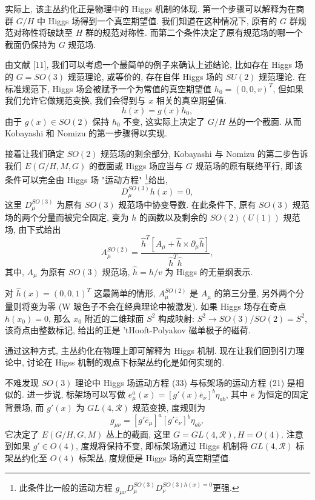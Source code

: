 \documentclass{article}
\begin{document}
实际上, 该主丛约化正是物理中的 Higgs 机制的体现. 第一个步骤可以解释为在商群 $G/H$ 中 Higgs 场得到一个真空期望值. 我们知道在这种情况下, 原有的 $G$ 群规范对称性将破缺至 $H$ 群的规范对称性. 而第二个条件决定了原有规范场的哪一个截面仍保持为 $G$ 规范场.

由文献 [11], 我们可以考虑一个最简单的例子来确认上述结论, 比如存在 Higgs 场的 $G=SO(3)$ 规范理论, 或等价的, 存在自伴 Higgs 场的 $SU(2)$ 规范理论. 在标准规范下, Higgs 场会被赋予一个为常值的真空期望值 $h_{0}=(0,0,v)^{T}$, 但如果我们允许它做规范变换, 我们会得到与 $x$ 相关的真空期望值.
\begin{equation}
h(x)=g(x)h_{0},
\end{equation}
由于 $g(x)\in SO(2)$ 保持 $h_{0}$ 不变, 这实际上决定了 $G/H$ 丛的一个截面. 从而 Kobayashi 和 Nomizu 的第一步骤得以实现.

接着让我们确定 $SO(2)$ 规范场的剩余部分, Kobayashi 与 Nomizu 的第二步告诉我们  $E(G/H,M,G)$ 的截面或 Higgs 场应当与 $G$ 规范场的原有联络平行, 即该条件可以完全由 Higgs 场 "运动方程" \footnote{此条件比一般的运动方程 $g_{\mu\nu}D_{\mu}^{SO(3)}D_{\nu}^{SO(3)h(x)=0}$更强.}给出,
\begin{equation}
D_{\mu}^{SO(3)}h(x)=0,
\end{equation}
这里 $D_{\mu}^{SO(3)}$ 为原有 $SO(3)$ 规范场中协变导数. 在此条件下, 原有 $SO(3)$ 规范场的两个分量而被完全固定, 变为 $h$ 的函数以及剩余的 $SO(2)(U(1))$ 规范场, 由下式给出
\begin{equation}
A_{\mu}^{SO(2)}=\frac{\hat{h}^{T}[A_{\mu}+\hat{h}\times \partial_{\mu}\hat{h}]}{\hat{h}^{T}\hat{h}},
\end{equation}
其中, $A_{\mu}$ 为原有 $SO(3)$ 规范场, $\hat{h}=h/v$ 为 Higgs 的无量纲表示.

对 $\hat{h}(x)=(0,0,1)^{T}$ 这最简单的情形, $A_{\mu}^{SO(2)}$ 是 $A_{\mu}$ 的第三分量, 另外两个分量则将变为零 (W 玻色子不会在经典理论中被激发). 如果 Higgs 场存在奇点 $h(x_{0})=0$, 那么 $x_{0}$ 附近的二维球面 $S^{2}$ 构成映射: $S^{2}\rightarrow SO(3)/SO(2)=S^{2}$, 该奇点由整数标记, 给出的正是 'tHooft-Polyakov 磁单极子的磁荷.

通过这种方式, 主丛约化在物理上即可解释为 Higgs 机制. 现在让我们回到引力理论中, 讨论在 Higss 机制的观点下标架丛约化是如何实现的.

不难发现 $SO(3)$ 理论中 Higgs 场运动方程 (33) 与标架场的运动方程 (21) 是相似的. 进一步说, 标架场可以写做 $e_{\mu}^{a}(x)=[g'(x)\bar{e}_{\nu}]^{b}\eta_{ab}$, 其中 $\bar{e}$ 为恒定的固定背景场, 而 $g'(x)$ 为 $GL(4,\mathcal{R})$ 规范变换, 度规则为
\begin{equation}
g_{\mu\nu}=[g'\bar{e}_{\mu}]^{a}[g'\bar{e}_{\nu}]^{b}\eta_{ab},
\end{equation}
它决定了 $E(G/H,G,M)$ 丛上的截面, 这里 $G=GL(4, \mathcal{R}), H=O(4)$. 注意到如果  $g'\in O(4)$, 度规将保持不变, 即标架场通过 Higgs 机制将 $GL(4, \mathcal{R})$ 标架丛约化至 $O(4)$ 标架丛, 度规便是 Higgs 场的真空期望值.
\end{document}

